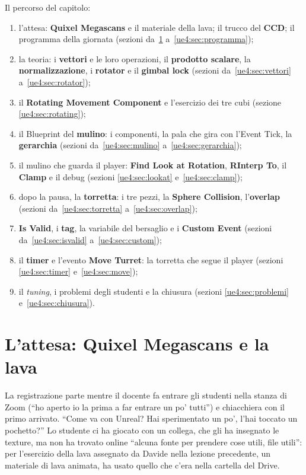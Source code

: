 Il percorso del capitolo:
\begin{enumerate}
  \item l'attesa: \textbf{Quixel Megascans} e il materiale della lava; il trucco del
        \textbf{CCD}; il programma della giornata (sezioni da~\ref{ue4:sec:attesa}
        a~\ref{ue4:sec:programma});
  \item la teoria: i \textbf{vettori} e le loro operazioni, il \textbf{prodotto
        scalare}, la \textbf{normalizzazione}, i \textbf{rotator} e il \textbf{gimbal
        lock} (sezioni da~\ref{ue4:sec:vettori} a~\ref{ue4:sec:rotator});
  \item il \textbf{Rotating Movement Component} e l'esercizio dei tre cubi (sezione
        \ref{ue4:sec:rotating});
  \item il Blueprint del \textbf{mulino}: i componenti, la pala che gira con
        l'Event Tick, la \textbf{gerarchia} (sezioni da~\ref{ue4:sec:mulino}
        a~\ref{ue4:sec:gerarchia});
  \item il mulino che guarda il player: \textbf{Find Look at Rotation},
        \textbf{RInterp To}, il \textbf{Clamp} e il debug (sezioni
        \ref{ue4:sec:lookat} e~\ref{ue4:sec:clamp});
  \item dopo la pausa, la \textbf{torretta}: i tre pezzi, la \textbf{Sphere
        Collision}, l'\textbf{overlap} (sezioni da~\ref{ue4:sec:torretta}
        a~\ref{ue4:sec:overlap});
  \item \textbf{Is Valid}, i \textbf{tag}, la variabile del bersaglio e i
        \textbf{Custom Event} (sezioni da~\ref{ue4:sec:isvalid}
        a~\ref{ue4:sec:custom});
  \item il \textbf{timer} e l'evento \textbf{Move Turret}: la torretta che segue il
        player (sezioni \ref{ue4:sec:timer} e~\ref{ue4:sec:move});
  \item il \emph{tuning}, i problemi degli studenti e la chiusura (sezioni
        \ref{ue4:sec:problemi} e~\ref{ue4:sec:chiusura}).
\end{enumerate}

\section{L'attesa: Quixel Megascans e la lava}
\label{ue4:sec:attesa}

La registrazione parte mentre il docente fa entrare gli studenti nella stanza di Zoom
(``ho aperto io la prima a far entrare un po' tutti'') e chiacchiera con il primo
arrivato. ``Come va con Unreal? Hai sperimentato un po', l'hai toccato un pochetto?''
Lo studente ci ha giocato con un collega, che gli ha insegnato le texture, ma non ha
trovato online ``alcuna fonte per prendere cose utili, file utili'': per l'esercizio
della lava assegnato da Davide nella lezione precedente, un materiale di lava animata,
ha usato quello che c'era nella cartella del Drive.

